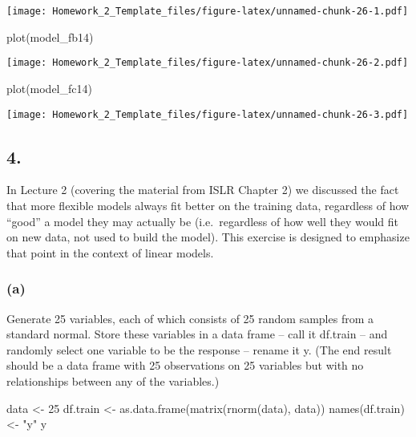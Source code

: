 \documentclass[
]{article}
\newenvironment{Shaded}{\begin{snugshade}}{\end{snugshade}}
\newcommand{\DecValTok}[1]{\textcolor[rgb]{0.00,0.00,0.81}{#1}}
\newcommand{\FunctionTok}[1]{\textcolor[rgb]{0.00,0.00,0.00}{#1}}
\newcommand{\NormalTok}[1]{#1}
\newcommand{\OtherTok}[1]{\textcolor[rgb]{0.56,0.35,0.01}{#1}}
\newcommand{\StringTok}[1]{\textcolor[rgb]{0.31,0.60,0.02}{#1}}
\begin{document}
\texttt{[image: Homework\_2\_Template\_files/figure-latex/unnamed-chunk-26-1.pdf]}

\begin{Shaded}
\begin{Highlighting}[]
\FunctionTok{plot}\NormalTok{(model\_fb14)}
\end{Highlighting}
\end{Shaded}

\texttt{[image: Homework\_2\_Template\_files/figure-latex/unnamed-chunk-26-2.pdf]}

\begin{Shaded}
\begin{Highlighting}[]
\FunctionTok{plot}\NormalTok{(model\_fc14)}
\end{Highlighting}
\end{Shaded}

\texttt{[image: Homework\_2\_Template\_files/figure-latex/unnamed-chunk-26-3.pdf]}

\hypertarget{section-2}{%
\subsection{4.}\label{section-2}}

In Lecture 2 (covering the material from ISLR Chapter 2) we discussed
the fact that more flexible models always fit better on the training
data, regardless of how ``good'' a model they may actually be
(i.e.~regardless of how well they would fit on new data, not used to
build the model). This exercise is designed to emphasize that point in
the context of linear models.

\hypertarget{a-6}{%
\subsubsection{(a)}\label{a-6}}

Generate 25 variables, each of which consists of 25 random samples from
a standard normal. Store these variables in a data frame -- call it
df.train -- and randomly select one variable to be the response --
rename it y. (The end result should be a data frame with 25 observations
on 25 variables but with no relationships between any of the variables.)

\begin{Shaded}
\begin{Highlighting}[]
\NormalTok{data }\OtherTok{\textless{}{-}} \DecValTok{25}
\NormalTok{df.train }\OtherTok{\textless{}{-}} \FunctionTok{as.data.frame}\NormalTok{(}\FunctionTok{matrix}\NormalTok{(}\FunctionTok{rnorm}\NormalTok{(data), data))}
\FunctionTok{names}\NormalTok{(df.train) }\OtherTok{\textless{}{-}} \StringTok{"y"}
\NormalTok{y}
\end{Highlighting}
\end{Shaded}
\end{document}
